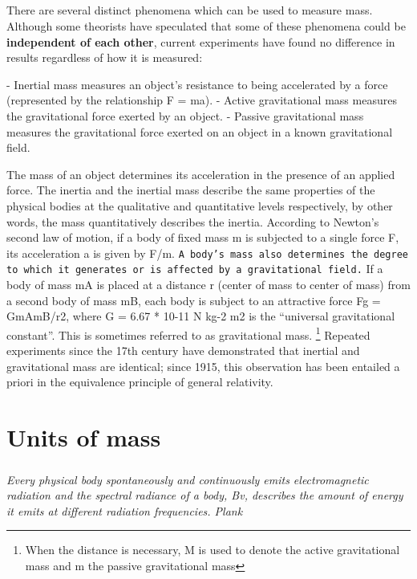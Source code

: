 \documentclass{book}
\begin{document}
	\paragraph{}
	
	There are several distinct phenomena which can be used to measure mass. Although some theorists have speculated that some of these phenomena could be \textbf{independent of each other}, current experiments have found no difference in results regardless of how it is measured:
	
	- Inertial mass measures an object's resistance to being accelerated by a force (represented by the relationship F = ma). - Active gravitational mass measures the gravitational force exerted by an object. - Passive gravitational mass measures the gravitational force exerted on an object in a known gravitational field.
	
	The mass of an object determines its acceleration in the presence of an applied force. The inertia and the inertial mass describe the same properties of the physical bodies at the qualitative and quantitative levels respectively, by other words, the mass quantitatively describes the inertia. According to Newton's second law of motion, if a body of fixed mass m is subjected to a single force F, its acceleration a is given by F/m. \texttt{A body's mass also determines the degree to which it generates or is affected by a gravitational field.} If a body of mass mA is placed at a distance r (center of mass to center of mass) from a second body of mass mB, each body is subject to an attractive force Fg = GmAmB/r2, where G = 6.67 * 10-11 N kg-2 m2 is the ``universal gravitational constant''. This is sometimes referred to as gravitational mass. \footnote{When the distance is necessary, M is used to denote the active gravitational mass and m the passive gravitational mass} Repeated experiments since the 17th century have demonstrated that inertial and gravitational mass are identical; since 1915, this observation has been entailed a priori in the equivalence principle of general relativity.
	
	\chapter{Units of mass}
	\paragraph{}
	\emph{Every physical body spontaneously and continuously emits electromagnetic radiation and the spectral radiance of a body, Bv, describes the amount of energy it emits at different radiation frequencies. \textemdash Plank}
\end{document}
